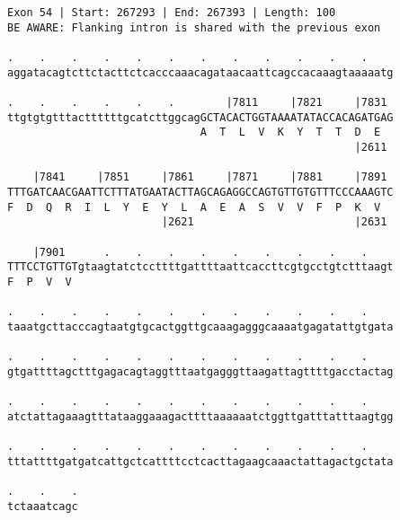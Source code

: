 \documentclass{article}
\begin{document}
\begin{Verbatim}[fontfamily=courier]
Exon 54 | Start: 267293 | End: 267393 | Length: 100
BE AWARE: Flanking intron is shared with the previous exon

.    .    .    .    .    .    .    .    .    .    .    .    
aggatacagtcttctacttctcacccaaacagataacaattcagccacaaagtaaaaatg

.    .    .    .    .    .        |7811     |7821     |7831 
ttgtgtgtttacttttttgcatcttggcagGCTACACTGGTAAAATATACCACAGATGAG
                              A  T  L  V  K  Y  T  T  D  E  
                                                      |2611 

    |7841     |7851     |7861     |7871     |7881     |7891 
TTTGATCAACGAATTCTTTATGAATACTTAGCAGAGGCCAGTGTTGTGTTTCCCAAAGTC
F  D  Q  R  I  L  Y  E  Y  L  A  E  A  S  V  V  F  P  K  V  
                        |2621                         |2631 

    |7901      .    .    .    .    .    .    .    .    .    
TTTCCTGTTGTgtaagtatctccttttgattttaattcaccttcgtgcctgtctttaagt
F  P  V  V                                                  

.    .    .    .    .    .    .    .    .    .    .    .    
taaatgcttacccagtaatgtgcactggttgcaaagagggcaaaatgagatattgtgata

.    .    .    .    .    .    .    .    .    .    .    .    
gtgattttagctttgagacagtaggtttaatgagggttaagattagttttgacctactag

.    .    .    .    .    .    .    .    .    .    .    .    
atctattagaaagtttataaggaaagacttttaaaaaatctggttgatttatttaagtgg

.    .    .    .    .    .    .    .    .    .    .    .    
tttattttgatgatcattgctcattttcctcacttagaagcaaactattagactgctata

.    .    .
tctaaatcagc
\end{Verbatim}
\newpage
\end{document}
